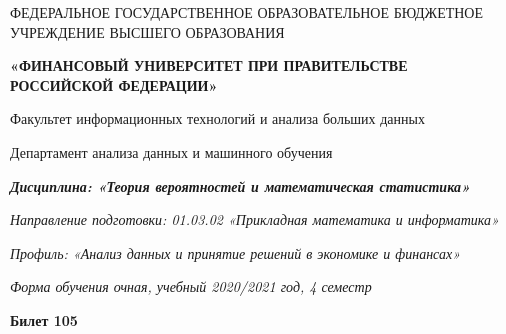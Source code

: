 \documentclass[a4paper,10pt]{article}
\begin{document}
\begin{center}
ФЕДЕРАЛЬНОЕ ГОСУДАРСТВЕННОЕ ОБРАЗОВАТЕЛЬНОЕ БЮДЖЕТНОЕ УЧРЕЖДЕНИЕ ВЫСШЕГО ОБРАЗОВАНИЯ

    \textbf{«ФИНАНСОВЫЙ УНИВЕРСИТЕТ ПРИ ПРАВИТЕЛЬСТВЕ РОССИЙСКОЙ ФЕДЕРАЦИИ»}

Факультет информационных технологий и анализа больших данных

Департамент анализа данных и машинного обучения

\textit{
	\textbf{Дисциплина: «Теория вероятностей и математическая статистика»}}

\textit{Направление подготовки: 01.03.02 «Прикладная математика и информатика»}

\textit{Профиль: «Анализ данных и принятие решений в экономике и финансах»}

\textit{Форма обучения очная, учебный 2020/2021 год, 4 семестр}

\textbf{Билет 105}

\end{center}
\end{document}
